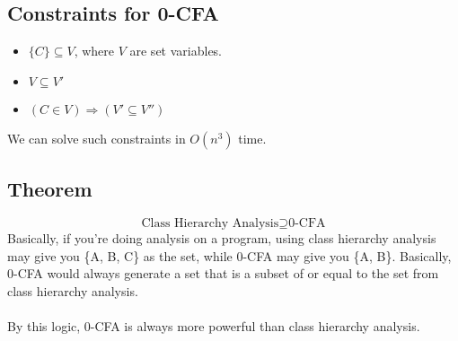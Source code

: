 \documentclass[10pt]{article}
\begin{document}
\subsection*{Constraints for 0-CFA}
\begin{itemize}
    \item $\{C\}\subseteq V$, where $V$ are set variables.
    \item $V \subseteq V'$
    \item $(C \in V) \Rightarrow (V' \subseteq V'')$
\end{itemize}
We can solve such constraints in $O(n^3)$ time.

\subsection*{Theorem}
\[\text{Class Hierarchy Analysis} \supseteq \text{0-CFA}\]
Basically, if you're doing analysis on a program, using class hierarchy analysis may give you \{A, B, C\} as the set, while 0-CFA may give you \{A, B\}.  Basically, 0-CFA would always generate a set that is a subset of or equal to the set from class hierarchy analysis.\\\\
By this logic, 0-CFA is always more powerful than class hierarchy analysis.
\end{document}
